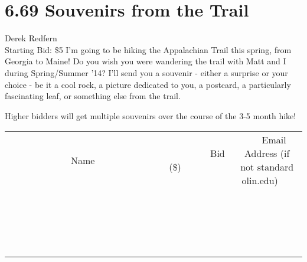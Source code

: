 \documentclass[11pt]{article}
\begin{document}
\section*{6.69 Souvenirs from the Trail}
Derek Redfern
\\
Starting Bid: \$5
\newline
I'm going to be hiking the Appalachian Trail this spring, from Georgia to Maine! Do you wish you were wandering the trail with Matt and I during Spring/Summer '14? I'll send you a souvenir - either a surprise or your choice - be it a cool rock, a picture dedicated to you, a postcard, a particularly fascinating leaf, or something else from the trail.

Higher bidders will get multiple souvenirs over the course of the 3-5 month hike!
\\[3ex]
\begin{tabular}{c c c}
~~~~~~~~~~~~~Name~~~~~~~~~~~~~ & ~~~~~~~~~Bid (\$)~~~~~~~~~  & ~~~Email Address (if not standard olin.edu)~~~\\
 & & \\
\hline
 & & \\
\hline
 & & \\
\hline
 & & \\
\hline
 & & \\
\hline
 & & \\
\hline
 & & \\
\hline
 & & \\
\hline
 & & \\
\hline
 & & \\
\hline
 & & \\
\hline
 & & \\
\hline
 & & \\
\hline
 & & \\
\hline
 & & \\
\hline
 & & \\
\hline
 & & \\
\hline
 & & \\
\hline
 & & \\
\hline
\end{tabular}
\newpage
\end{document}
